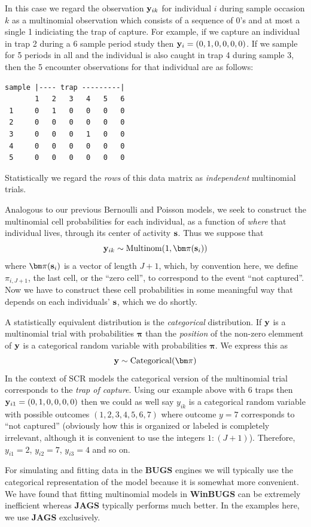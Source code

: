 {In this case we regard the observation ${\bf y}_{ik}$ for
individual $i$ during sample occasion $k$ as a multinomial observation
which consists of a sequence of 0's and at most a single 1 indiciating
the trap of capture. For example, if we capture an individual in trap
2 during a 6 sample period study then ${\bf y}_{i} = (0,1,0,0,0,0)$.
If we sample for 5 periods in all and the individual is also caught
in trap 4 during sample 3, then the 5 encounter observations for that
individual are as follows:
\begin{verbatim}
sample |---- trap ---------|
       1   2   3   4   5   6
 1     0   1   0   0   0   0
 2     0   0   0   0   0   0
 3     0   0   0   1   0   0
 4     0   0   0   0   0   0
 5     0   0   0   0   0   0
\end{verbatim}
Statistically we regard the {\it rows} of this data matrix as {\it
  independent} multinomial trials.

Analogous to our previous Bernoulli and Poisson models, we seek to
construct the multinomial cell probabilities for each individual, as a
function of {\it where} that individual lives, through its center of
activity ${\bf s}$. Thus we suppose that
\[
 {\bf y}_{ik} \sim \mbox{Multinom}(1, {\bm \pi}({\bf s}_{i}) )
\]
where ${\bm \pi}({\bf s}_{i})$ is a vector of length $J+1$, which, by
convention here, we define $\pi_{i,J+1}$, the last cell, or the ``zero
cell'', to correspond to the event ``not captured''.  Now we have to
construct these cell probabilities in some meaningful way that depends
on each individuals' ${\bf s}$, which we do shortly.

A statistically equivalent distribution is the {\it categorical} distribution.
If ${\bf y}$ is a multinomial trial with probabilities
${\bm \pi}$ than the {\it position} of the non-zero
elemment of ${\bf y}$ is a categorical random variable with probabilities
${\bm \pi}$.
We express this as
\[
{\bf y} \sim \mbox{Categorical}( {\bm \pi} )
\]
In the context of SCR models the categorical version of the
multinomial trial corresponds to the {\it trap of capture}.  Using our
example above with 6 traps then ${\bf y}_{i1} = (0,1,0,0,0,0)$ then we
could as well say $y_{ik}$ is a categorical random variable with
possible outcomes $(1,2,3,4,5,6,7)$ where outcome $y=7$ corresponds to
``not captured'' (obviously how this is organized or labeled is
completely irrelevant, although it is convenient to use the integers
$1:(J+1)$).  Therefore, $y_{i1} = 2$, $y_{i2} = 7$, $y_{i3} = 4$ and
so on.

For simulating and fitting data in the {\bf BUGS} engines we will typically use
the categorical representation of the model because it is somewhat
more convenient.  We have found that fitting multinomial models in
{\bf WinBUGS} can be extremely inefficient whereas {\bf JAGS}
typically performs much better. In the examples here, we use {\bf
  JAGS} exclusively.

}
